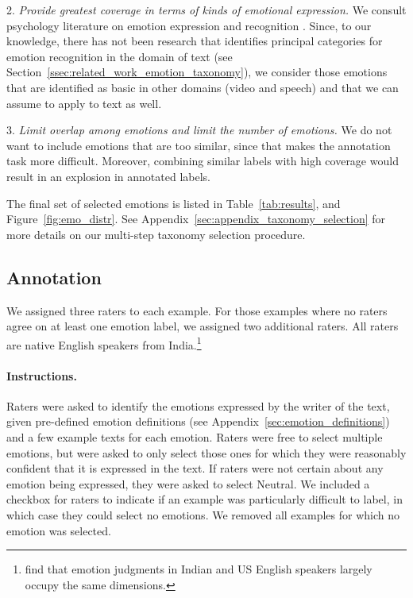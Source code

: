 \documentclass[11pt,a4paper]{article}
\begin{document}
2. \emph{Provide greatest coverage in terms of kinds of emotional expression.}
We consult psychology literature on emotion expression and recognition \citep{plutchik1980general, cowen2017self,cowen2019primacy}. Since, to our knowledge, there has not been research that identifies principal categories for emotion recognition in the domain of text (see Section~\ref{ssec:related_work_emotion_taxonomy}), we consider those emotions that are identified as basic in other domains (video and speech) and that we can assume to apply to text as well.

3. \emph{Limit overlap among emotions and limit the number of emotions.}
We do not want to include emotions that are too similar, since that makes the annotation task more difficult. Moreover, combining similar labels with high coverage would result in an explosion in annotated labels.

The final set of selected emotions is listed in Table~\ref{tab:results}, and Figure~\ref{fig:emo_distr}. See Appendix~\ref{sec:appendix_taxonomy_selection} for more details on our multi-step taxonomy selection procedure.







\subsection{Annotation}
\label{ssec:annotation}

We assigned three raters to each example. For those examples where no raters agree on at least one emotion label, we assigned two additional raters. All raters are native English speakers from India.\footnote{\citet{cowen2019primacy} find that emotion judgments in Indian and US English speakers largely occupy the same dimensions.}

\paragraph{Instructions.} Raters were asked to identify the emotions expressed by the writer of the text, given pre-defined emotion definitions (see Appendix~\ref{sec:emotion_definitions}) and a few example texts for each emotion. Raters were free to select multiple emotions, but were asked to only select those ones for which they were reasonably confident that it is expressed in the text. If raters were not certain about any emotion being expressed, they were asked to select Neutral. We included a checkbox for raters to indicate if an example was particularly difficult to label, in which case they could select no emotions. We removed all examples for which no emotion was selected.
\end{document}
